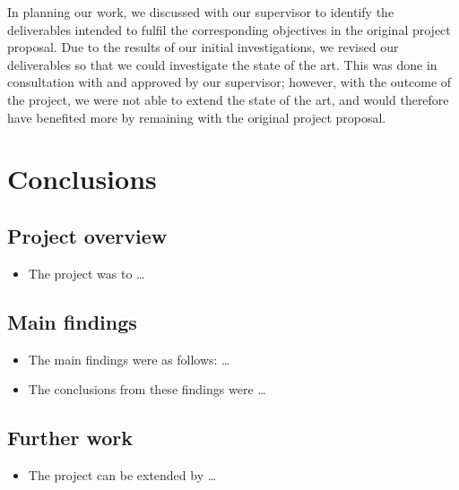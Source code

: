\documentclass[12pt,a4paper]{article}
\begin{document}
In planning our work, we discussed with our supervisor to identify the deliverables intended to fulfil the corresponding objectives in the original project proposal. Due to the results of our initial investigations, we revised our deliverables so that we could investigate the state of the art. This was done in consultation with and approved by our supervisor; however, with the outcome of the project, we were not able to extend the state of the art, and would therefore have benefited more by remaining with the original project proposal. 

\newpage
\section{Conclusions}
\subsection{Project overview}
\begin{itemize}
    \item The project was to \dots
\end{itemize}

\subsection{Main findings}
\begin{itemize}
    \item The main findings were as follows: \dots
    \item The conclusions from these findings were \dots
\end{itemize}

\subsection{Further work}
\begin{itemize}
    \item The project can be extended by \dots
\end{itemize}

\newpage

\end{document}
